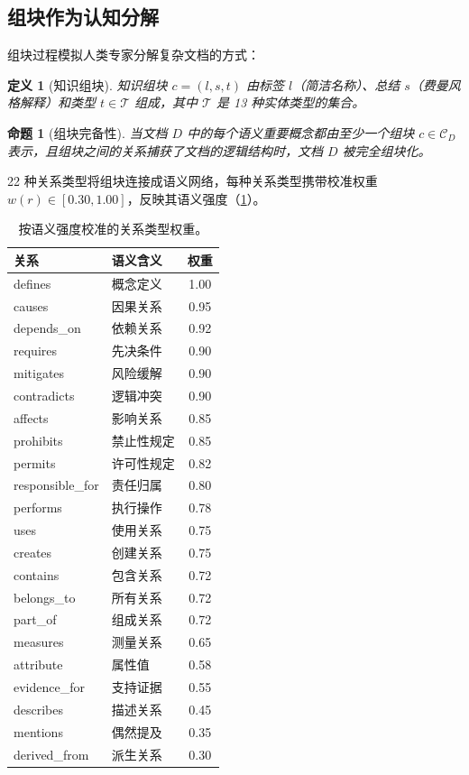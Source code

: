 \documentclass[11pt]{article}
\newtheorem{definition}{定义}
\newtheorem{proposition}{命题}
\begin{document}
\subsection{组块作为认知分解}

组块过程模拟人类专家分解复杂文档的方式：

\begin{definition}[知识组块]
知识组块 $c = (l, s, t)$ 由标签 $l$（简洁名称）、总结 $s$（费曼风格解释）和类型 $t \in \mathcal{T}$ 组成，其中 $\mathcal{T}$ 是 13 种实体类型的集合。
\end{definition}

\begin{proposition}[组块完备性]
当文档 $D$ 中的每个语义重要概念都由至少一个组块 $c \in \mathcal{C}_D$ 表示，且组块之间的关系捕获了文档的逻辑结构时，文档 $D$ 被完全组块化。
\end{proposition}

22 种关系类型将组块连接成语义网络，每种关系类型携带校准权重 $w(r) \in [0.30, 1.00]$，反映其语义强度（\cref{tab:edge-weights}）。

\begin{table}[htbp]
\centering
\caption{按语义强度校准的关系类型权重。}
\label{tab:edge-weights}
\begin{tabular}{@{}llc@{}}
\toprule
\textbf{关系} & \textbf{语义含义} & \textbf{权重} \\
\midrule
defines & 概念定义 & 1.00 \\
causes & 因果关系 & 0.95 \\
depends\_on & 依赖关系 & 0.92 \\
requires & 先决条件 & 0.90 \\
mitigates & 风险缓解 & 0.90 \\
contradicts & 逻辑冲突 & 0.90 \\
affects & 影响关系 & 0.85 \\
prohibits & 禁止性规定 & 0.85 \\
permits & 许可性规定 & 0.82 \\
responsible\_for & 责任归属 & 0.80 \\
performs & 执行操作 & 0.78 \\
uses & 使用关系 & 0.75 \\
creates & 创建关系 & 0.75 \\
contains & 包含关系 & 0.72 \\
belongs\_to & 所有关系 & 0.72 \\
part\_of & 组成关系 & 0.72 \\
measures & 测量关系 & 0.65 \\
attribute & 属性值 & 0.58 \\
evidence\_for & 支持证据 & 0.55 \\
describes & 描述关系 & 0.45 \\
mentions & 偶然提及 & 0.35 \\
derived\_from & 派生关系 & 0.30 \\
\bottomrule
\end{tabular}
\end{table}
\end{document}
